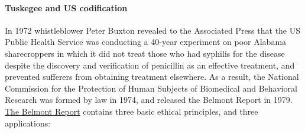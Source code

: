 \documentclass[12pt] {article}
\begin{document}
\paragraph{Tuskegee and US
codification}\label{tuskegee-and-us-codification}

In 1972 whistleblower Peter Buxton revealed to the Associated Press that
the US Public Health Service was conducting a 40-year experiment on poor
Alabama sharecroppers in which it did not treat those who had syphilis
for the disease despite the discovery and verification of penicillin as
an effective treatment, and prevented sufferers from obtaining
treatment elsewhere. As a result, the National Commission for the
Protection of Human Subjects of Biomedical and Behavioral Research was
formed by law in 1974, and released the Belmont Report in 1979. \href{http://www.hhs.gov/ohrp/humansubjects/guidance/belmont.html}{The
Belmont Report} contains three basic ethical principles, and three applications:
\end{document}
